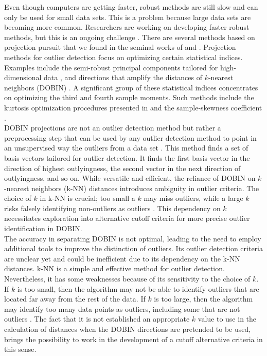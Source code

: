 \documentclass[12pt]{article}
\begin{document}
Even though computers are getting faster, robust methods are still slow and can only be used for small data sets. This is a problem because large data sets are becoming more common. Researchers are working on developing faster robust methods, but this is an ongoing challenge \citep{Filzmoser2008}. There are several methods based on projection pursuit that we found in the seminal works of \citet{Huber1985, Friedman1987, Jones1987} and \citet{PenaPrieto2000}. Projection methods for outlier detection focus on optimizing certain statistical indices. Examples include the semi-robust principal components tailored for high-dimensional data \citep{Filzmoser2008}, and directions that amplify the distances of $k$-nearest neighbors (DOBIN) \citep{Kandanaarachchi2021}. A significant group of these statistical indices concentrates on optimizing the third and fourth sample moments. Such methods include the kurtosis optimization procedures presented in \citep{PeñaPrieto2001b,PeñaPrieto2007,PeñaPrietoViladomat,Ortiz2026} and the sample-skewness coefficient \citep{Loperfido2013, Loperfido2018,Ortiz2024}.\\

DOBIN projections are not an outlier detection method but rather a preprocessing step that can be used by any outlier detection method to point in an unsupervised way the outliers from a data set \citep{Kandanaarachchi2021}. This method finds a set of basis vectors tailored for outlier detection. It finds the first basis vector in the direction of highest outlyingness, the second vector in the next direction of outlyingness, and so on. While versatile and efficient, the reliance of DOBIN on $k$-nearest neighbors (k-NN) distances introduces ambiguity in outlier criteria. The choice of \( k \) in k-NN is crucial; too small a \( k \) may miss outliers, while a large \( k \) risks falsely identifying non-outliers as outliers \citep{Ma2021}. This dependency on \( k \) necessitates exploration into alternative cutoff criteria for more precise outlier identification in DOBIN.\\

The accuracy in separating DOBIN is not optimal, leading to the need to employ additional tools to improve the distinction of outliers. Its outlier detection criteria are unclear yet and could be inefficient due to its dependency on the k-NN distances. k-NN is a simple and effective method for outlier detection. Nevertheless, it has some weaknesses because of its sensitivity to the choice of $k$. If $k$ is too small, then the algorithm may not be able to identify outliers that are located far away from the rest of the data. If $k$ is too large, then the algorithm may identify too many data points as outliers, including some that are not outliers \citep{Ma2021}. The fact that it is not established an appropriate $k$ value to use in the calculation of distances when the DOBIN directions are pretended to be used, brings the possibility to work in the development of a cutoff alternative criteria in this sense.\\
\end{document}
